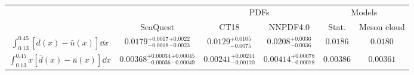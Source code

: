 \begin{tabular}{cccccc}
\hline
 &          & \multicolumn{2}{c}{PDFs} & \multicolumn{2}{c}{Models} \\ \cline{3-6} 
 & SeaQuest & CT18      & NNPDF4.0     & Stat.     & Meson cloud    \\ \hline
$\int^{0.45}_{0.13} \left[\bar{d}\left(x\right) - \bar{u}\left(x\right) \right]\dd{x}$ &
  $0.0179   _{-0.0018}^{+0.0017} {}_{-0.0023}^{+0.0022}$ &
  $0.0129^{+0.0105}_{-0.0075}$ &
  $0.0208^{+0.0036}_{-0.0036}$ &
  $0.0186$ &
  $0.0180$ \\
$\int^{0.45}_{0.13} x\left[\bar{d}\left(x\right) - \bar{u}\left(x\right) \right]\dd{x}$ &
  $0.00368 _{-0.00036}^{+0.00034} {}_{-0.00049}^{+0.00045}$ &
  $0.00241^{+0.00244}_{-0.00170}$ &
  $0.00414^{+0.00078}_{-0.00078}$ &
  $0.00386$ &
  $0.00361$ \\ \hline
\end{tabular}

